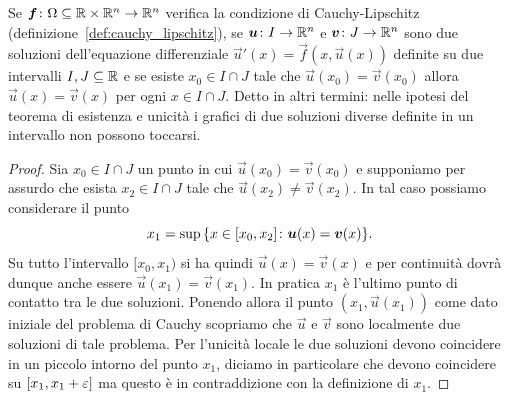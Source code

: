 \begin{proposition}
\label{prop:separazione_soluzioni}%
Se $\boldsymbol f\colon \Omega\subseteq {\mathbb R} \times {\mathbb R}^n\to {\mathbb R}^n$
verifica la condizione di Cauchy-Lipschitz (definizione~\ref{def:cauchy_lipschitz}),
se $\boldsymbol u\colon I \to {\mathbb R}^n$ e $\boldsymbol v\colon J\to{\mathbb R}^n$ sono due soluzioni
dell'equazione differenziale
$\vec u'(x) = \vec f(x,\vec u(x))$
definite su due intervalli $I,J \subseteq {\mathbb R}$  
e se esiste $x_0\in I\cap J$ tale che $\vec u(x_0) = \vec v(x_0)$ allora $\vec u(x) = \vec v(x)$ per ogni $x\in I\cap J$.
Detto in altri termini: nelle ipotesi del teorema di esistenza e unicità i grafici di due soluzioni diverse definite in un intervallo non possono toccarsi.
\end{proposition}
%
\begin{proof}
Sia $x_0 \in I\cap J$ un punto in cui $\vec u(x_0) = \vec v(x_0)$
e supponiamo per assurdo che esista $x_2 \in I\cap J$ tale che $\vec u(x_2)\neq \vec v(x_2)$. In tal caso possiamo considerare il punto
\[
   x_1 = \sup {\left\{ x \in [x_0,x_2] \colon \boldsymbol u(x) = \boldsymbol v(x) \right\}}.
\]
Su tutto l'intervallo $[x_0,x_1)$ si ha quindi $\vec u(x) = \vec v(x)$ e per continuità dovrà dunque anche essere $\vec u(x_1) =  \vec v(x_1)$.
In pratica $x_1$ è l'ultimo punto di contatto tra le due soluzioni.
Ponendo allora il punto $(x_1,\vec u(x_1))$ come dato iniziale del problema di Cauchy scopriamo che $\vec u$ e $\vec v$ sono localmente due soluzioni di tale problema. Per l'unicità locale le due soluzioni devono coincidere in un piccolo intorno del punto $x_1$, diciamo in particolare che devono coincidere su $[x_1,x_1+\varepsilon]$ ma questo è in contraddizione con la definizione di $x_1$.
\end{proof}

